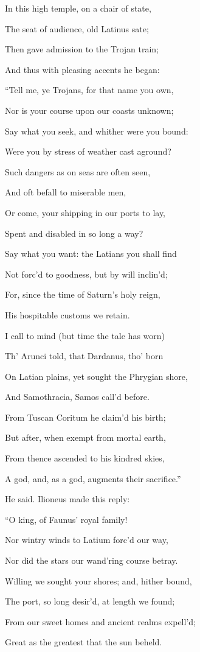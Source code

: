 In this high temple, on a chair of state,

The seat of audience, old Latinus sate;

Then gave admission to the Trojan train;

And thus with pleasing accents he began:

“Tell me, ye Trojans, for that name you own,

Nor is your course upon our coasts unknown;

Say what you seek, and whither were you bound:

Were you by stress of weather cast aground?

Such dangers as on seas are often seen,

And oft befall to miserable men,

Or come, your shipping in our ports to lay,

Spent and disabled in so long a way?

Say what you want: the Latians you shall find

Not forc’d to goodness, but by will inclin’d;

For, since the time of Saturn’s holy reign,

His hospitable customs we retain.

I call to mind (but time the tale has worn)

Th’ Arunci told, that Dardanus, tho’ born

On Latian plains, yet sought the Phrygian shore,

And Samothracia, Samos call’d before.

From Tuscan Coritum he claim’d his birth;

But after, when exempt from mortal earth,

From thence ascended to his kindred skies,

A god, and, as a god, augments their sacrifice.”

He said. Ilioneus made this reply:

“O king, of Faunus’ royal family!

Nor wintry winds to Latium forc’d our way,

Nor did the stars our wand’ring course betray.

Willing we sought your shores; and, hither bound,

The port, so long desir’d, at length we found;

From our sweet homes and ancient realms expell’d;

Great as the greatest that the sun beheld.


